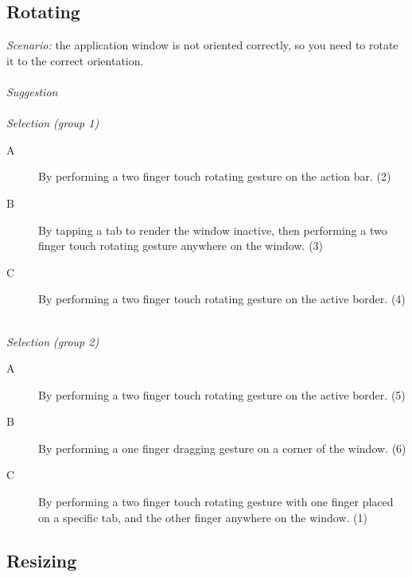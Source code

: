 \subsection{Rotating}
\emph{Scenario:}
the application window is not oriented correctly, so you need to rotate it to the correct orientation. 
\hfill\\
\hfill\\
\emph{Suggestion}
\hfill\\
\hfill\\
\emph{Selection (group 1)}
\begin{description}
\item[A]{By performing a two finger touch rotating gesture on the action bar. (2)}
\item[B]{By tapping a tab to render the window inactive, then performing a two finger touch rotating gesture anywhere on the window. (3)}
\item[C]{By performing a two finger touch rotating gesture on the active border. (4)}
\end{description}
\hfill\\
\emph{Selection (group 2)}
\begin{description}
\item[A]{By performing a two finger touch rotating gesture on the active border. (5)}
\item[B]{By performing a one finger dragging gesture on a corner of the window. (6)}
\item[C]{By performing a two finger touch rotating gesture with one finger placed on a specific tab, and the other finger anywhere on the window. (1)}
\end{description}


\subsection{Resizing}

